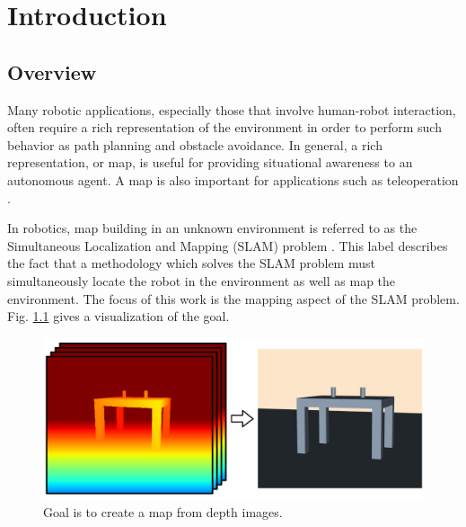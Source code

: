 
\chapter{Introduction} \label{chapter:introduction}
\section{Overview}



Many robotic applications, especially those that involve human-robot
interaction, often require a rich representation of the environment in order to
perform such behavior as path planning and obstacle avoidance. In general, a
rich representation, or map, is useful for providing situational awareness to an
autonomous agent. A map is also important for applications such as teleoperation
\cite{Kadous2006}.

In robotics, map building in an unknown environment is referred to as the
Simultaneous Localization and Mapping (SLAM) problem \cite{Thrun2002}. This
label describes the fact that a methodology which solves the SLAM problem must
simultaneously locate the robot in the environment as well as map the
environment. The focus of this work is the mapping aspect of the SLAM problem.
Fig. \ref{fig:goal} gives a visualization of the goal.

\begin{figure}[h]%
\centering
  \includegraphics[width=.75\textwidth]{figures/diagram_goal.png}
  \caption{Goal is to create a map from depth images.}
  \label{fig:goal}
\end{figure}

